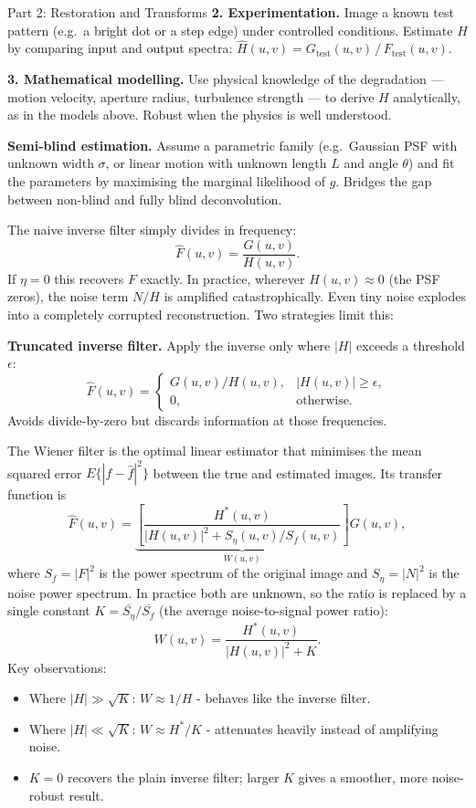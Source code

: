 \documentclass[letterpaper]{article}
\begin{document}
\begin{notes}{Part 2: Restoration and Transforms}
\textbf{2. Experimentation.} Image a known test pattern (e.g.\ a bright dot or a step edge) under controlled conditions. Estimate $H$ by comparing input and output spectra: $\hat{H}(u,v) = G_\text{test}(u,v)\,/\,F_\text{test}(u,v)$.

\textbf{3. Mathematical modelling.} Use physical knowledge of the degradation — motion velocity, aperture radius, turbulence strength — to derive $H$ analytically, as in the models above. Robust when the physics is well understood.

\textbf{Semi-blind estimation.} Assume a parametric family (e.g.\ Gaussian PSF with unknown width $\sigma$, or linear motion with unknown length $L$ and angle $\theta$) and fit the parameters by maximising the marginal likelihood of $g$. Bridges the gap between non-blind and fully blind deconvolution.


The naive inverse filter simply divides in frequency:
$$\hat{F}(u,v) = \frac{G(u,v)}{H(u,v)}.$$
If $\eta = 0$ this recovers $F$ exactly. In practice, wherever $H(u,v)\approx 0$ (the PSF zeros), the noise term $N/H$ is amplified catastrophically. Even tiny noise explodes into a completely corrupted reconstruction. Two strategies limit this:

\textbf{Truncated inverse filter.} Apply the inverse only where $|H|$ exceeds a threshold $\epsilon$:
$$\hat{F}(u,v) = \begin{cases} G(u,v)/H(u,v), & |H(u,v)| \ge \epsilon,\\ 0, & \text{otherwise.}\end{cases}$$
Avoids divide-by-zero but discards information at those frequencies.


The Wiener filter is the optimal linear estimator that minimises the mean squared error $E\{|f - \hat{f}|^2\}$ between the true and estimated images. Its transfer function is
$$\hat{F}(u,v) = \underbrace{\left[\frac{H^*(u,v)}{|H(u,v)|^2 + S_\eta(u,v)/S_f(u,v)}\right]}_{W(u,v)} G(u,v),$$
where $S_f = |F|^2$ is the power spectrum of the original image and $S_\eta = |N|^2$ is the noise power spectrum. In practice both are unknown, so the ratio is replaced by a single constant $K = \overline{S_\eta}/\overline{S_f}$ (the average noise-to-signal power ratio):
$$W(u,v) = \frac{H^*(u,v)}{|H(u,v)|^2 + K}.$$
Key observations:
\begin{itemize}
    \item Where $|H| \gg \sqrt{K}$: $W \approx 1/H$ - behaves like the inverse filter.
    \item Where $|H| \ll \sqrt{K}$: $W \approx H^*/K$ - attenuates heavily instead of amplifying noise.
    \item $K=0$ recovers the plain inverse filter; larger $K$ gives a smoother, more noise-robust result.
\end{itemize}


\end{notes}
\end{document}
